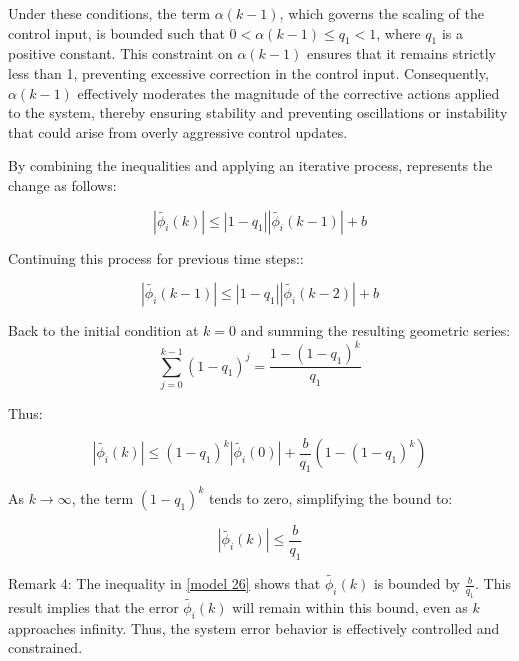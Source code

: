 \documentclass[journal,onecolumn]{IEEEtran}
\begin{document}
Under these conditions, the term \(\alpha(k-1)\), which governs the scaling of the control input, is bounded such that \(0 < \alpha(k-1) \leq q_1 < 1\), where \(q_1\) is a positive constant. This constraint on \(\alpha(k-1)\) ensures that it remains strictly less than 1, preventing excessive correction in the control input. Consequently, \(\alpha(k-1)\) effectively moderates the magnitude of the corrective actions applied to the system, thereby ensuring stability and preventing oscillations or instability that could arise from overly aggressive control updates.



By combining the inequalities and applying an iterative process, represents the change as follows:

\begin{equation}
\label{model 23}
|\tilde{\phi_i}(k)| \leq |1 - q_1| |\tilde{\phi_i}(k-1)| + b
\end{equation}

Continuing this process for previous time steps::

\begin{equation}
\label{model 24}
|\tilde{\phi_i}(k-1)| \leq |1 - q_1| |\tilde{\phi_i}(k-2)| + b
\end{equation}

Back to the initial condition at \(k=0\) and summing the resulting geometric series:
\[
\sum_{j=0}^{k-1} (1-q_1)^j = \frac{1-(1-q_1)^k}{q_1}
\]

Thus:

\begin{equation}
\label{model 25}
|\tilde{\phi_i}(k)| \leq (1 - q_1)^k |\tilde{\phi_i}(0)| + \frac{b}{q_1} (1 - (1 - q_1)^k)
\end{equation}

As \(k \rightarrow \infty\), the term \((1-q_1)^k\) tends to zero, simplifying the bound to:

\begin{equation}
\label{model 26}
|\tilde{\phi_i}(k)| \leq \frac{b}{q_1}
\end{equation}



Remark 4: The inequality in \eqref{model 26} shows that \(\tilde{\phi_i}(k)\) is bounded by \(\frac{b}{q_1}\). This result implies that the error \(\tilde{\phi_i}(k)\) will remain within this bound, even as \(k\) approaches infinity. Thus, the system error behavior is effectively controlled and constrained.
\end{document}
